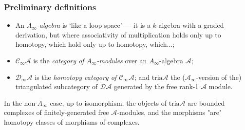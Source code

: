 \documentclass{beamer}
\begin{document}
        \begin{frame}\frametitle{Preliminary definitions}
            \begin{definition}
                \begin{itemize}
                    \item An \emph{$A_\infty$-algebra} is `like a loop space' --- it is a $k$-algebra with a graded derivation, but where associativity of multiplication holds only up to homotopy, which hold only up to homotopy, which...;
                    \item $\mathcal{C}_\infty\mathcal{A}$ is the \emph{category of $A_\infty$-modules} over an $A_\infty$-algebra $\mathcal{A}$;
                    \item $\mathcal{D}_\infty\mathcal{A}$ is the \emph{homotopy category of $\mathcal{C}_\infty\mathcal{A}$}; and $\mathrm{tria}\mathcal{A}$ the ($\mathcal{A}_\infty$-version of the) triangulated subcategory of $\mathcal{D}\mathcal{A}$ generated by the free rank-1 $\mathcal{A}$ module.
                \end{itemize}
                \pause
                In the non-$A_\infty$ case, up to isomorphism, the objects of $\mathrm{tria}\mathcal{A}$ are bounded complexes of finitely-generated free $\mathcal{A}$-modules, and the morphisms "are" homotopy classes of morphisms of complexes.
            \end{definition}
        \end{frame}
\end{document}
